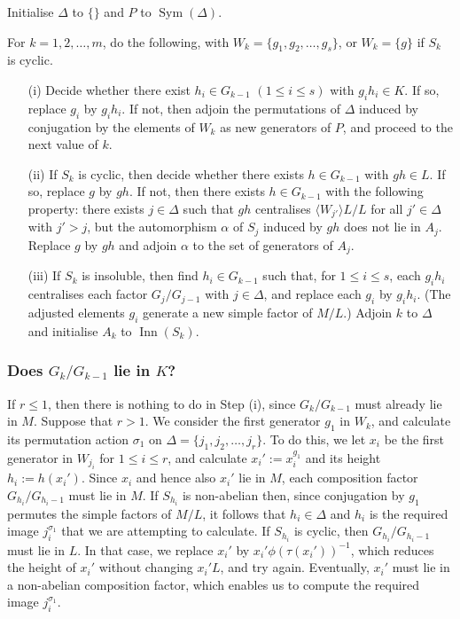 \documentclass[12pt,twoside,reqno,psamsfonts]{amsproc}
\numberwithin{equation}{section}
\numberwithin{figure}{section}
\theoremstyle{plain}
\theoremstyle{definition}
\theoremstyle{remark}
\providecommand{\Sym}[1]{\operatorname{Sym}( #1 )}
\DeclareMathOperator{\Inn}{Inn}
\begin{document}
\medskip \noindent
Initialise $\Delta$ to $\{\}$ and $P$ to $\Sym{\Delta}$.

\medskip \noindent
For $k =1,2,\ldots,m$, do the following, with $W_k = \{g_1,g_2,\ldots,g_s\}$,
or $W_k = \{g\}$ if $S_k$ is cyclic.
\begin{enumerate}
\item[(i)] Decide whether there exist 
$h_i \in G_{k-1}$ $(1 \leqslant i \leqslant s)$ with $g_ih_i \in K$.
If so, replace $g_i$ by $g_ih_i$. If not, then adjoin the permutations of
$\Delta$ induced by conjugation by the elements of $W_k$ as new generators
of $P$, and proceed to the next value of $k$. 

\item[(ii)] If $S_k$ is cyclic, then
decide whether there exists $h \in G_{k-1}$  with $gh \in L$.
If so, replace $g$ by $gh$. If not, then there exists $h \in G_{k-1}$ with the
following property: there exists $j \in \Delta$ such that $gh$ centralises
$\langle W_{j'} \rangle L/L$
for all $j'\in \Delta$ with $j'>j$, but the automorphism $\alpha$ of
$S_j$ induced by $gh$ does not lie in $A_j$.
Replace $g$ by $gh$ and adjoin $\alpha$ to the set of generators of $A_j$.

\item[(iii)]
If $S_k$ is insoluble, then find 
$h_i \in G_{k-1}$ such that, for $1 \leqslant i \leqslant s$, each $g_ih_i$ centralises
each factor $G_j/G_{j-1}$ with $j \in \Delta$, and replace
each $g_i$ by $g_ih_i$. (The adjusted elements $g_i$ generate a new 
simple factor of $M/L$.)
Adjoin $k$ to $\Delta$ and initialise $A_k$ to $\Inn(S_k)$.
\end{enumerate}

\subsubsection{Does $G_k/G_{k-1}$ lie in $K$?}\label{subsection:test1}
If $r\leqslant 1$, then there is nothing to do in Step (i), since $G_k/G_{k-1}$
must already lie in $M$. Suppose that $r>1$.
We consider the first generator $g_1$ in $W_k$, and calculate its permutation
action $\sigma_1$ on $\Delta = \{j_1,j_2,\ldots,j_r\}$.
To do this, we let $x_i$ be the first generator in $W_{j_i}$ for
$1 \leqslant i \leqslant r$, and calculate $x_i' := x_i^{g_1}$ and its height
$h_i := h(x_i')$.
Since $x_i$ and hence also $x_i'$ lie in $M$, each composition factor
$G_{h_i}/G_{h_i-1}$ must lie in $M$. If $S_{h_i}$ is non-abelian then, since
conjugation by $g_1$ permutes the simple factors of $M/L$, 
it follows that $h_i \in  \Delta$ and $h_i$ is the 
required image $j_i^{\sigma_1}$
that we are attempting to
calculate. If $S_{h_i}$  is cyclic, then $G_{h_i}/G_{h_i-1}$ must lie
in $L$. In that case, we replace $x_i'$ by $x_i' \phi(\tau(x_i'))^{-1}$, which
reduces the height of $x_i'$ without changing $x_i'L$, and try again.
Eventually, $x_i'$ must lie in a non-abelian composition factor, which enables
us to compute the required image $j_i^{\sigma_1}$. 
\end{document}
